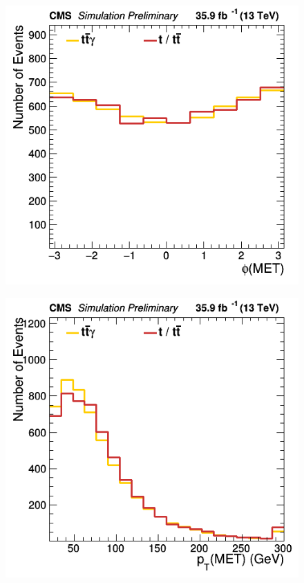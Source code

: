\documentclass[11pt]{scrartcl}
\begin{document}
	\begin{figure}[H]
	\centering
	\begin{minipage}{.5\textwidth}
	  \centering
	  \includegraphics[width=0.75\linewidth]{figures/Select1/MET_phi.png}
	  \label{fig:METphi}
	\end{minipage}%
	\begin{minipage}{.5\textwidth}
	  \centering
	  \includegraphics[width=0.75\linewidth]{figures/Select1/MET_pt.png}
	  \label{fig:METpt}
	\end{minipage}
	\end{figure}
	
\end{document}
